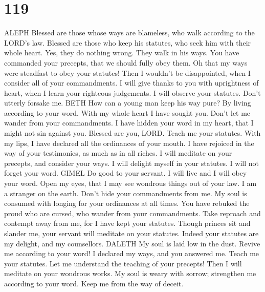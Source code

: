 \hypertarget{section-111}{%
\section{119}\label{section-111}}

ALEPH  Blessed are those whose ways are blameless, who walk
according to the LORD's law.  Blessed are those who keep his
statutes, who seek him with their whole heart.  Yes, they do
nothing wrong. They walk in his ways.  You have commanded
your precepts, that we should fully obey them.  Oh that my
ways were steadfast to obey your statutes!  Then I wouldn't
be disappointed, when I consider all of your commandments. 
I will give thanks to you with uprightness of heart, when I learn your
righteous judgements.  I will observe your statutes. Don't
utterly forsake me. BETH  How can a young man keep his way
pure? By living according to your word.  With my whole
heart I have sought you. Don't let me wander from your commandments.
 I have hidden your word in my heart, that I might not sin
against you.  Blessed are you, LORD. Teach me your
statutes.  With my lips, I have declared all the ordinances
of your mouth.  I have rejoiced in the way of your
testimonies, as much as in all riches.  I will meditate on
your precepts, and consider your ways.  I will delight
myself in your statutes. I will not forget your word. GIMEL
 Do good to your servant. I will live and I will obey your
word.  Open my eyes, that I may see wondrous things out of
your law.  I am a stranger on the earth. Don't hide your
commandments from me.  My soul is consumed with longing for
your ordinances at all times.  You have rebuked the proud
who are cursed, who wander from your commandments.  Take
reproach and contempt away from me, for I have kept your statutes.
 Though princes sit and slander me, your servant will
meditate on your statutes.  Indeed your statutes are my
delight, and my counsellors. DALETH  My soul is laid low in
the dust. Revive me according to your word!  I declared my
ways, and you answered me. Teach me your statutes.  Let me
understand the teaching of your precepts! Then I will meditate on your
wondrous works.  My soul is weary with sorrow; strengthen
me according to your word.  Keep me from the way of deceit.
